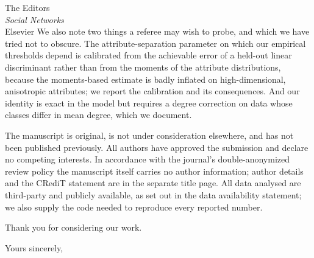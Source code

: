 \documentclass[11pt]{letter}
\begin{document}
\begin{letter}{The Editors \\ \textit{Social Networks} \\ Elsevier}
We also note two things a referee may wish to probe, and which we have tried not to
obscure. The attribute-separation parameter on which our empirical thresholds depend
is calibrated from the achievable error of a held-out linear discriminant rather than
from the moments of the attribute distributions, because the moments-based estimate is
badly inflated on high-dimensional, anisotropic attributes; we report the calibration
and its consequences. And our identity is exact in the model but requires a degree
correction on data whose classes differ in mean degree, which we document.

The manuscript is original, is not under consideration elsewhere, and has not been
published previously. All authors have approved the submission and declare no
competing interests. In accordance with the journal's double-anonymized review policy
the manuscript itself carries no author information; author details and the CRediT
statement are in the separate title page. All data analysed are third-party and
publicly available, as set out in the data availability statement; we also supply the
code needed to reproduce every reported number.

Thank you for considering our work.

\closing{Yours sincerely,}

\end{letter}
\end{document}
